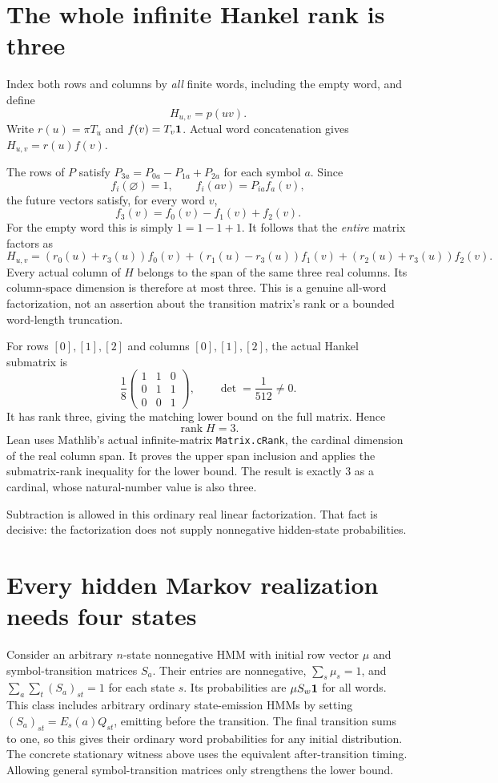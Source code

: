 \documentclass[11pt]{article}
\begin{document}
\newpage
\section*{The whole infinite Hankel rank is three}
Index both rows and columns by \emph{all} finite words,
including the empty word, and define
\[
                         H_{u,v}=p(uv).
\]
Write $r(u)=\pi T_u$ and $f(v)=T_v{\bf1}$. Actual word
concatenation gives $H_{u,v}=r(u)f(v)$.

The rows of $P$ satisfy
$P_{3a}=P_{0a}-P_{1a}+P_{2a}$ for each symbol $a$.
Since
\[
 f_i(\varnothing)=1,\qquad f_i(av)=P_{ia}f_a(v),
\]
the future vectors satisfy, for every word $v$,
\[
                     f_3(v)=f_0(v)-f_1(v)+f_2(v).
\]
For the empty word this is simply $1=1-1+1$.
It follows that the \emph{entire} matrix factors as
\[
 H_{u,v}=
 (r_0(u)+r_3(u))f_0(v)
 +(r_1(u)-r_3(u))f_1(v)
 +(r_2(u)+r_3(u))f_2(v).
\]
Every actual column of $H$ belongs to the span of the same
three real columns. Its column-space dimension is therefore
at most three. This is a genuine all-word factorization,
not an assertion about the transition matrix's rank or a
bounded word-length truncation.

For rows $[0],[1],[2]$ and columns $[0],[1],[2]$, the
actual Hankel submatrix is
\[
       \frac18\begin{pmatrix}1&1&0\\0&1&1\\0&0&1\end{pmatrix},
             \qquad \det=\frac1{512}\ne0.
\]
It has rank three, giving the matching lower bound on
the full matrix. Hence
\[
                         \operatorname{rank}H=3.
\]
Lean uses Mathlib's actual infinite-matrix
\texttt{Matrix.cRank}, the cardinal dimension of the real
column span. It proves the upper span inclusion and applies
the submatrix-rank inequality for the lower bound. The
result is exactly $3$ as a cardinal, whose natural-number
value is also three.

Subtraction is allowed in this ordinary real linear
factorization. That fact is decisive: the factorization
does not supply nonnegative hidden-state probabilities.

\newpage
\section*{Every hidden Markov realization needs four states}
Consider an arbitrary $n$-state nonnegative HMM with initial
row vector $\mu$ and symbol-transition matrices $S_a$.
Their entries are nonnegative, $\sum_s\mu_s=1$, and
$\sum_a\sum_t(S_a)_{st}=1$ for each state $s$.
Its probabilities are $\mu S_w{\bf1}$ for all words.
This class includes arbitrary ordinary state-emission HMMs
by setting $(S_a)_{st}=E_s(a)Q_{st}$, emitting before the
transition. The final transition sums to one, so this gives
their ordinary word probabilities for any initial distribution.
The concrete stationary witness above uses the equivalent
after-transition timing. Allowing general symbol-transition
matrices only strengthens the lower bound.
\end{document}
